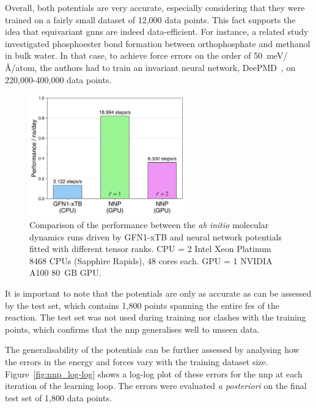 Overall, both potentials are very accurate, especially considering that they were trained on a fairly small dataset of 12,000 data points. This fact supports the idea that equivariant \acp{gnn} are indeed data-efficient. For instance, a related study~\citep{benayadPrebioticChemicalReactivity2024} investigated phosphoester bond formation between orthophosphate and methanol in bulk water. In that case, to achieve force errors on the order of 50~meV/\AA/atom, the authors had to train an invariant neural network, DeePMD~\citep{zengDeePMDkitV2Software2023}, on 220,000-400,000 data points.

\begin{figure}[b!]
    \centering
    \includegraphics[width=0.6\textwidth]{Figures/4_Results/results_performance_comparison.png}
    \caption{Comparison of the performance between the \textit{ab initio} molecular dynamics runs driven by GFN1-xTB and neural network potentials fitted with different tensor ranks. CPU = 2 Intel Xeon Platinum 8468 CPUs (Sapphire Rapids), 48 cores each. GPU = 1 NVIDIA A100 80~GB GPU.}
    \label{fig:performance_comparison}
\end{figure}

It is important to note that the potentials are only as accurate as can be assessed by the test set, which contains 1,800 points spanning the entire \ac{fes} of the reaction. The test set was not used during training nor clashes with the training points, which confirms that the \ac{nnp} generalises well to unseen data.

The generalisability of the potentials can be further assessed by analysing how the errors in the energy and forces vary with the training dataset size. Figure~\ref{fig:nnp_log-log} shows a log-log plot of these errors for the \ac{nnp} at each iteration of the learning loop. The errors were evaluated \textit{a posteriori} on the final test set of 1,800 data points.

